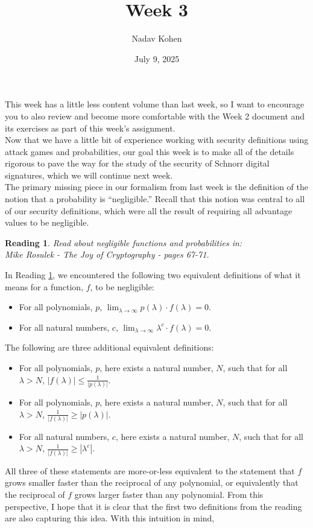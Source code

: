\documentclass[12pt]{article}
\newcommand{\verts}[1]{\left\vert #1\right\vert}
\newtheorem{reading}{Reading}
\theoremstyle{definition}
\theoremstyle{remark}
\theoremstyle{definition}
\begin{document}
\title{Week 3}
\author{Nadav Kohen}
\date{July 9, 2025}
\maketitle

This week has a little less content volume than last week, so I want to encourage you to also review and become more comfortable with the Week 2 document and its exercises as part of this week's assignment.\\

Now that we have a little bit of experience working with security definitions using attack games and probabilities, our goal this week is to make all of the details rigorous to pave the way for the study of the security of Schnorr digital signatures, which we will continue next week.\\

The primary missing piece in our formalism from last week is the definition of the notion that a probability is ``negligible.'' Recall that this notion was central to all of our security definitions, which were all the result of requiring all advantage values to be negligible.

\begin{reading}\label{negl}
Read about negligible functions and probabilities in:\\
Mike Rosulek - The Joy of Cryptography - pages 67-71.
\end{reading}

In Reading \ref{negl}, we encountered the following two equivalent definitions of what it means for a function, $f$, to be negligible:
\begin{itemize}
\item For all polynomials, $p$, $\lim_{\lambda\to\infty}p(\lambda)\cdot f(\lambda) = 0$.
\item For all natural numbers, $c$, $\lim_{\lambda\to\infty}\lambda^c\cdot f(\lambda) = 0$.
\end{itemize}
The following are three additional equivalent definitions:
\begin{itemize}
\item For all polynomials, $p$, here exists a natural number, $N$, such that for all $\lambda>N$, $\verts{f(\lambda)}\leq \frac{1}{\verts{p(\lambda)}}$.
\item For all polynomials, $p$, here exists a natural number, $N$, such that for all $\lambda>N$, $\frac{1}{\verts{f(\lambda)}}\geq \verts{p(\lambda)}$.
\item For all natural numbers, $c$, here exists a natural number, $N$, such that for all $\lambda>N$, $\frac{1}{\verts{f(\lambda)}}\geq \verts{\lambda^c}$.
\end{itemize}
All three of these statements are more-or-less equivalent to the statement that $f$ grows smaller faster than the reciprocal of any polynomial, or equivalently that the reciprocal of $f$ grows larger faster than any polynomial. From this perspective, I hope that it is clear that the first two definitions from the reading are also capturing this idea. With this intuition in mind,
\end{document}
